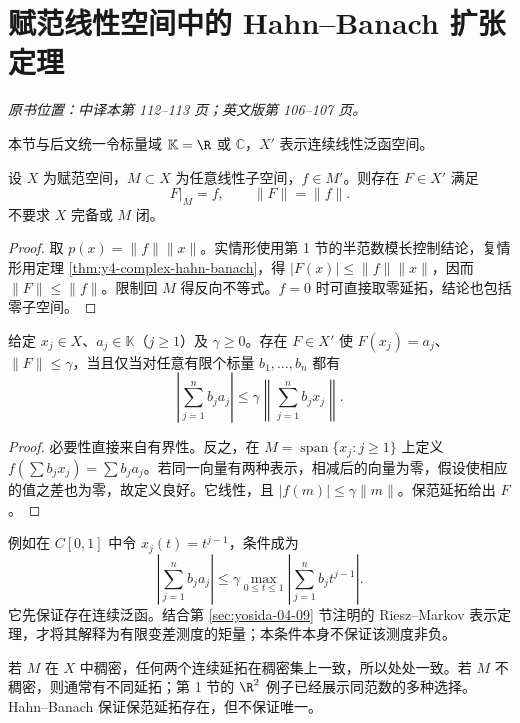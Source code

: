 \section{赋范线性空间中的 Hahn--Banach 扩张定理}\label{sec:yosida-04-05}
\noindent\textit{原书位置：中译本第 112--113 页；英文版第 106--107 页。}

本节与后文统一令标量域 $\mathbb K=\R$ 或 $\mathbb C$，$X'$ 表示连续线性泛函空间。

\begin{theorem}[保范延拓]\label{thm:y4-norm-preserving}
设 $X$ 为赋范空间，$M\subset X$ 为任意线性子空间，$f\in M'$。则存在 $F\in X'$ 满足
\[
 F|_M=f,\qquad \|F\|=\|f\|.
\]
不要求 $X$ 完备或 $M$ 闭。
\end{theorem}
\begin{proof}
取 $p(x)=\|f\|\|x\|$。实情形使用第 1 节的半范数模长控制结论，复情形用定理 \ref{thm:y4-complex-hahn-banach}，得 $|F(x)|\le\|f\|\|x\|$，因而 $\|F\|\le\|f\|$。限制回 $M$ 得反向不等式。$f=0$ 时可直接取零延拓，结论也包括零子空间。
\end{proof}

\begin{theorem}\label{thm:y4-moment-condition}
给定 $x_j\in X$、$a_j\in\mathbb K$（$j\ge1$）及 $\gamma\ge0$。存在 $F\in X'$ 使 $F(x_j)=a_j$、$\|F\|\le\gamma$，当且仅当对任意有限个标量 $b_1,\ldots,b_n$ 都有
\[
 \left|\sum_{j=1}^n b_ja_j\right|
 \le\gamma\left\|\sum_{j=1}^n b_jx_j\right\|.
\]
\end{theorem}
\begin{proof}
必要性直接来自有界性。反之，在 $M=\operatorname{span}\{x_j:j\ge1\}$ 上定义
$f(\sum b_jx_j)=\sum b_ja_j$。若同一向量有两种表示，相减后的向量为零，假设使相应的值之差也为零，故定义良好。它线性，且 $|f(m)|\le\gamma\|m\|$。保范延拓给出 $F$。
\end{proof}

例如在 $C[0,1]$ 中令 $x_j(t)=t^{j-1}$，条件成为
\[
 \left|\sum_{j=1}^n b_ja_j\right|
 \le\gamma\max_{0\le t\le1}\left|\sum_{j=1}^n b_jt^{j-1}\right|.
\]
它先保证存在连续泛函。结合第 \ref{sec:yosida-04-09} 节注明的 Riesz--Markov 表示定理，才将其解释为有限变差测度的矩量；本条件本身不保证该测度非负。

\begin{example}[稠密性决定唯一性]
若 $M$ 在 $X$ 中稠密，任何两个连续延拓在稠密集上一致，所以处处一致。若 $M$ 不稠密，则通常有不同延拓；第 1 节的 $\R^2$ 例子已经展示同范数的多种选择。Hahn--Banach 保证保范延拓存在，但不保证唯一。
\end{example}

